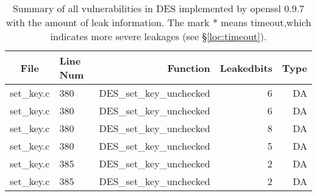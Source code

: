 \begin{table}%
\centering\tiny
\caption{Summary of all vulnerabilities in DES implemented by openssl 0.9.7 with the amount of leak information. The mark $*$ means timeout,which indicates more severe leakages (see \S\ref{loc:timeout}).}\label{tab:DESopenssl}
\begin{tabular}{clrrr}
\hline
\textbf{File} & \textbf{Line Num} & \textbf{Function} & \textbf{Leakedbits} & \textbf{Type} \\\hline
set\_key.c& 380&DES\_set\_key\_unchecked&6 &DA\\
set\_key.c& 380&DES\_set\_key\_unchecked&6 &DA\\
set\_key.c& 380&DES\_set\_key\_unchecked&8 &DA\\
set\_key.c& 380&DES\_set\_key\_unchecked&5 &DA\\
set\_key.c& 385&DES\_set\_key\_unchecked&2 &DA\\
set\_key.c& 385&DES\_set\_key\_unchecked&2 &DA\\
\hline
\end{tabular}
\end{table}